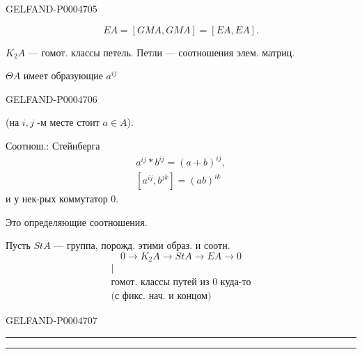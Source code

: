\begin{GelfandAdjacentEvidence}{GELFAND-P000470}{5}

\[
EA=[GMA,GMA]=[EA,EA].
\]

$K_2A$ — гомот. классы петель. Петли — соотношения элем. матриц.

$\Theta A$ имеет образующие $a^{ij}$
\end{GelfandAdjacentEvidence}
\begin{GelfandAdjacentEvidence}{GELFAND-P000470}{6}

(на $i,j$ -м месте стоит $a\in A$).

Соотнош.: Стейнберга
\[
\begin{gathered}
a^{ij}\ast b^{ij}=(a+b)^{ij},\\
[a^{ij},b^{jk}]=(ab)^{ik}
\end{gathered}
\]
и у нек-рых коммутатор $0$.

Это определяющие соотношения.

Пусть $StA$ — группа, порожд. этими образ. и соотн.
\[
0\longrightarrow K_2A\longrightarrow StA\longrightarrow EA\longrightarrow0
\]
\[
\begin{gathered}
\vert\\[-.2ex]
\text{гомот. классы путей из }0\text{ куда-то}\\
\text{(с фикс. нач. и концом)}
\end{gathered}
\]
\end{GelfandAdjacentEvidence}
\begin{GelfandAdjacentEvidence}{GELFAND-P000470}{7}


{\centering\rule{3.1em}{.4pt}\quad\textperiodcentered\quad\rule{4em}{.4pt}\par}
\end{GelfandAdjacentEvidence}

